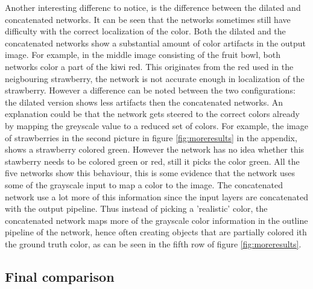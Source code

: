 Another interesting differenc to notice, is the difference between the dilated and concatenated networks. It can be seen that the networks sometimes still have difficulty with the correct localization of the color. Both the dilated and the concatenated networks show a substantial amount of color artifacts in the output image. For example, in the middle image consisting of the fruit bowl, both networks color a part of the kiwi red. This originates from the red used in the neigbouring strawberry, the network is not accurate enough in localization of the strawberry. However a difference can be noted between the two configurations: the dilated version shows less artifacts then the concatenated networks. An explanation could be that the network gets steered to the correct colors already by mapping the greyscale value to a reduced set of colors. For example, the image of strawberries in the second picture in figure \ref{fig:moreresults} in the appendix, shows a strawberry colored green. However the network has no idea whether this stawberry needs to be colored green or red, still it picks the color green. All the five networks show this behaviour, this is some evidence that the network uses some of the grayscale input to map a color to the image. The concatenated network use a lot more of this information since the input layers are concatenated with the output pipeline. Thus instead of picking a 'realistic' color, the concatenated network maps more of the grayscale color information in the outline pipeline of the network, hence often creating objects that are partially colored ith the ground truth color, as can be seen in the fifth row of figure \ref{fig:moreresults}.
\subsection{Final comparison}








